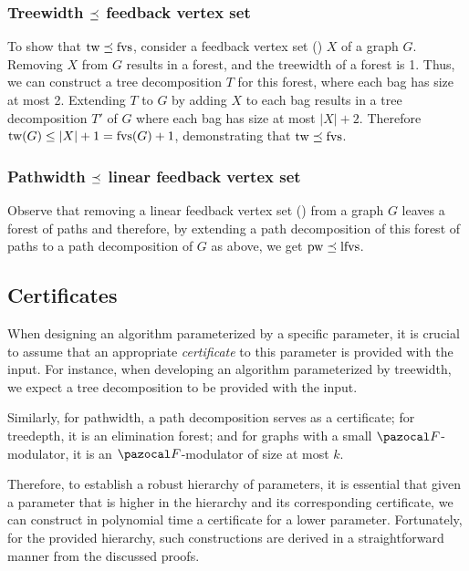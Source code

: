 

\subsubsection*{Treewidth $\preceq$ feedback vertex set}

To show that $\text{tw} \preceq \text{fvs}$, consider a feedback vertex set (\fvs) $X$ of a graph $G$. Removing $X$ from $G$ results in a forest, and the treewidth of a forest is 1. Thus, we can construct a tree decomposition $T$ for this forest, where each bag has size at most 2. Extending $T$ to $G$ by adding $X$ to each bag results in a tree decomposition $T'$ of $G$ where each bag has size at most $|X| + 2$. Therefore $\text{tw}(G) \leq |X| + 1 = \text{fvs}(G) + 1$, demonstrating that $\text{tw} \preceq \text{fvs}$.

\subsubsection*{Pathwidth $\preceq$ linear feedback vertex set}

Observe that removing a linear feedback vertex set (\lfvs) from a graph $G$ leaves a forest of paths and therefore, by extending a path decomposition of this forest of paths to a path decomposition of $G$ as above, we get $\text{pw} \preceq \text{lfvs}$.

\subsection{Certificates}

When designing an algorithm parameterized by a specific parameter, it is crucial to assume that an appropriate \textit{certificate} to this parameter is provided with the input. For instance, when developing an algorithm parameterized by treewidth, we expect a tree decomposition to be provided with the input.

Similarly, for pathwidth, a path decomposition serves as a certificate; for treedepth, it is an elimination forest; and for graphs with a small $\F$-modulator, it is an $\F$-modulator of size at most $k$.

Therefore, to establish a robust hierarchy of parameters, it is essential that given a parameter that is higher in the hierarchy and its corresponding certificate, we can construct in polynomial time a certificate for a lower parameter. Fortunately, for the provided hierarchy, such constructions are derived in a straightforward manner from the discussed proofs.

